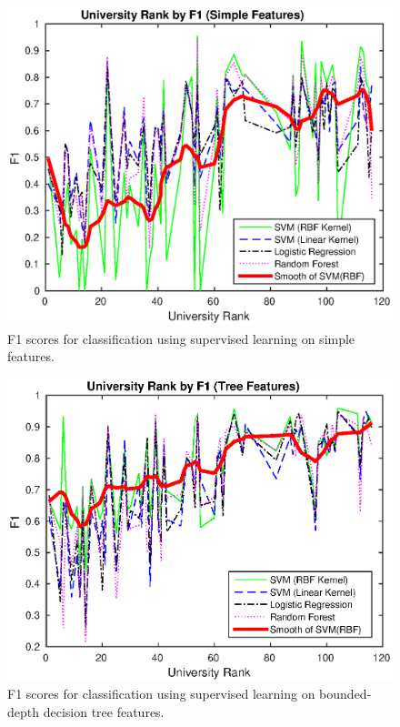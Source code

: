 \documentclass{sig-alternate-05-2015}
\begin{document}
\begin{figure}[h]
\centering
\includegraphics[scale=0.6]{simple_features.eps}
\caption{F1 scores for classification using supervised learning on simple features.}
\label{fig:simple_features}
\end{figure}

\begin{figure}
\centering
\includegraphics[scale=0.6]{tree_features.eps}
\caption{F1 scores for classification using supervised learning on bounded-depth decision tree features.}
\label{fig:tree_features}
\end{figure}
\end{document}
